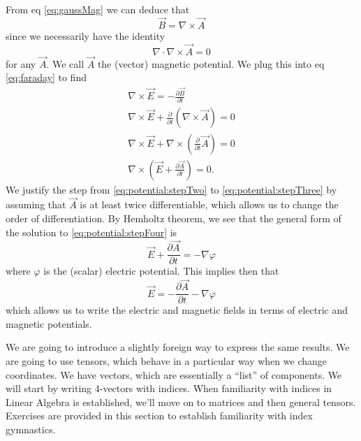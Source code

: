 From eq \eqref{eq:gaussMag} we can deduce that
\begin{equation}%
\vec{B} = \nabla\times\vec{A}
\end{equation}
since we necessarily have the identity
\begin{equation}%
\nabla\cdot\nabla\times\vec{A} = 0
\end{equation}
for any $\vec{A}$. We call $\vec{A}$ the (vector) magnetic
potential. We plug this into eq \eqref{eq:faraday} to find
\begin{subequations}
\begin{align}
\nabla\times\vec{E} = -\frac{\partial\vec{B}}{\partial t}\\
\nabla\times\vec{E}+\frac{\partial}{\partial t}\left(\nabla\times\vec{A}\right) = 0\label{eq:potential:stepTwo}\\
\nabla\times\vec{E}+\nabla\times\left(\frac{\partial}{\partial t}\vec{A}\right) = 0\label{eq:potential:stepThree}\\
\nabla\times\left(\vec{E}+\frac{\partial\vec{A}}{\partial t}\right) = 0.\label{eq:potential:stepFour}
\end{align}
\end{subequations}
We justify the step from \eqref{eq:potential:stepTwo} to
\eqref{eq:potential:stepThree} by assuming that $\vec{A}$ is at least twice
differentiable, which allows us to change the order of
differentiation. By Hemholtz theorem, we see that the general
form of the solution to \eqref{eq:potential:stepFour} is 
\begin{equation}%
\vec{E} + \frac{\partial \vec{A}}{\partial t} = -\nabla \varphi
\end{equation} 
where $\varphi$ is the (scalar) electric potential. This implies then that
\begin{equation}%
\vec{E} = -\frac{\partial \vec{A}}{\partial t} -\nabla \varphi
\end{equation}
which allows us to write the electric and magnetic fields in
terms of electric and magnetic potentials.

 We are going to
introduce a slightly foreign way to express the same results. We
are going to use tensors, which behave in a particular way when
we change coordinates. We have vectors, which are essentially a
``list'' of components. We will start by writing 4-vectors with
indices. When familiarity with indices in Linear Algebra is
established, we'll move on to matrices and then general
tensors. Exercises are provided in this section to establish
familiarity with index gymnastics.

